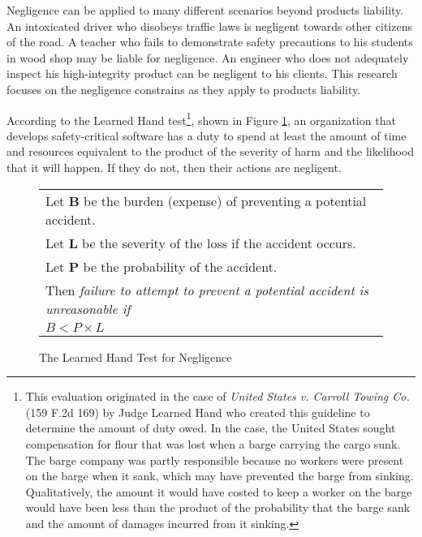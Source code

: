 Negligence can be applied to many different scenarios beyond products
liability. An intoxicated driver who disobeys traffic laws is negligent towards
other citizens of the road. A teacher who fails to demonstrate safety
precautions to his students in wood shop may be liable for negligence. An
engineer who does not adequately inspect his high-integrity product can be
negligent to his clients. This research focuses on the negligence constrains as
they apply to products liability.

According to the Learned Hand test\footnote{This evaluation originated in the
case of \textit{United States v. Carroll Towing Co.} (159 F.2d 169) by Judge
Learned Hand who created this guideline to determine the amount of duty owed.
In the case, the United States sought compensation for flour that was lost when
a barge carrying the cargo sunk. The barge company was partly responsible
because no workers were present on the barge when it sank, which may have
prevented the barge from sinking. Qualitatively, the amount it would have costed
to keep a worker on the barge would have been less than the product of the
probability that the barge sank and the amount of damages incurred from it
sinking.}, shown in Figure \ref{fig:handtest}, an organization that develops 
safety-critical software has a duty to spend at least the amount of time and
resources equivalent to the product of the severity of harm and the likelihood 
that it will happen. If they do not, then their actions are negligent.

\begin{figure}
\begin{narrow}{-1.5in}{-1.5in}\begin{center}
\begin{tabular}{|l|}
\hline
	Let \textbf{B} be the burden (expense) of preventing a potential accident.\\
	Let \textbf{L} be the severity of the loss if the accident occurs.\\
	Let \textbf{P} be the probability of the accident.\\[6pt]
	Then \textit{failure to attempt to prevent a potential accident is 
	unreasonable if}\\[8pt]

      \centerline{\(B < P \times L\)}
\\[3pt]
\hline
\end{tabular}
\end{center}\end{narrow}
\caption{The Learned Hand Test for Negligence}
\label{fig:handtest}
\end{figure}

